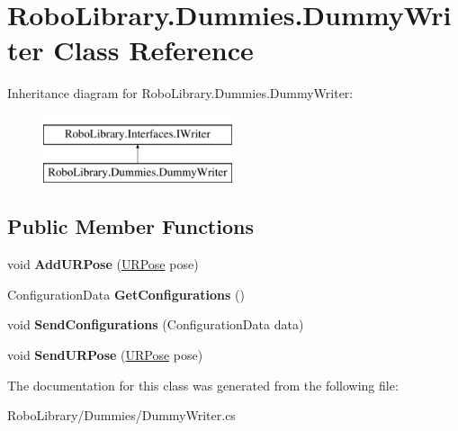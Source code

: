 \hypertarget{class_robo_library_1_1_dummies_1_1_dummy_writer}{}\section{Robo\+Library.\+Dummies.\+Dummy\+Writer Class Reference}
\label{class_robo_library_1_1_dummies_1_1_dummy_writer}
Inheritance diagram for Robo\+Library.\+Dummies.\+Dummy\+Writer\+:\begin{figure}[H]
\begin{center}
\leavevmode
\includegraphics[height=2.000000cm]{class_robo_library_1_1_dummies_1_1_dummy_writer}
\end{center}
\end{figure}
\subsection*{Public Member Functions}
\begin{DoxyCompactItemize}
\item 
\hypertarget{class_robo_library_1_1_dummies_1_1_dummy_writer_a2155b71709d72392aa0ada9242361db2}{}\label{class_robo_library_1_1_dummies_1_1_dummy_writer_a2155b71709d72392aa0ada9242361db2} 
void {\bfseries Add\+U\+R\+Pose} (\hyperlink{class_robo_library_1_1_u_r_pose}{U\+R\+Pose} pose)
\item 
\hypertarget{class_robo_library_1_1_dummies_1_1_dummy_writer_ae57a769174305f42d5c0131b04a20933}{}\label{class_robo_library_1_1_dummies_1_1_dummy_writer_ae57a769174305f42d5c0131b04a20933} 
Configuration\+Data {\bfseries Get\+Configurations} ()
\item 
\hypertarget{class_robo_library_1_1_dummies_1_1_dummy_writer_a39ab96112c6e1bed36372716604cc7d9}{}\label{class_robo_library_1_1_dummies_1_1_dummy_writer_a39ab96112c6e1bed36372716604cc7d9} 
void {\bfseries Send\+Configurations} (Configuration\+Data data)
\item 
\hypertarget{class_robo_library_1_1_dummies_1_1_dummy_writer_a8d9d949161a038abb1d6e75e5879bcc6}{}\label{class_robo_library_1_1_dummies_1_1_dummy_writer_a8d9d949161a038abb1d6e75e5879bcc6} 
void {\bfseries Send\+U\+R\+Pose} (\hyperlink{class_robo_library_1_1_u_r_pose}{U\+R\+Pose} pose)
\end{DoxyCompactItemize}


The documentation for this class was generated from the following file\+:\begin{DoxyCompactItemize}
\item 
Robo\+Library/\+Dummies/Dummy\+Writer.\+cs\end{DoxyCompactItemize}
